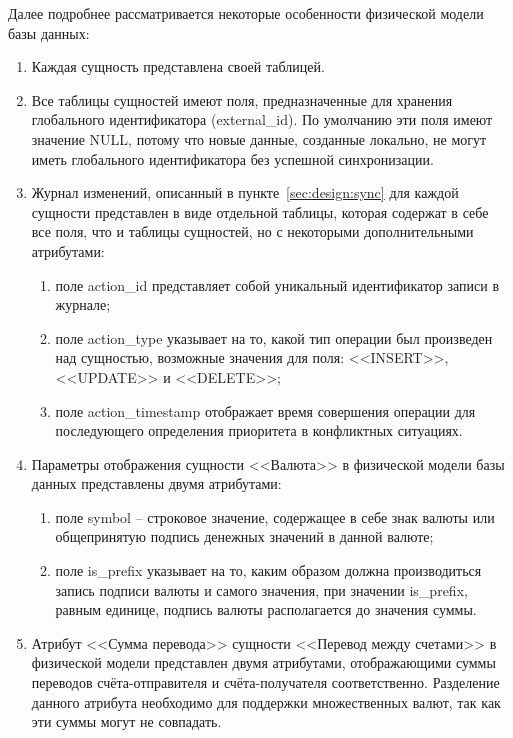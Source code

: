 Далее подробнее рассматривается некоторые особенности физической модели базы данных:
\begin{enumerate}
    \item Каждая сущность представлена своей таблицей.
    \item Все таблицы сущностей имеют поля, предназначенные для хранения глобального идентификатора (external\_id).
    По умолчанию эти поля имеют значение NULL, потому что новые данные, созданные локально, не могут иметь глобального идентификатора без успешной синхронизации.
    \item Журнал изменений, описанный в пункте~\ref{sec:design:sync} для каждой сущности представлен в виде отдельной таблицы, которая содержат в себе все поля, что и таблицы сущностей, но с некоторыми дополнительными атрибутами:
    \begin{enumerate}
        \item поле action\_id представляет собой уникальный идентификатор записи в журнале;
        \item поле action\_type указывает на то, какой тип операции был произведен над сущностью, возможные значения для поля: <<INSERT>>, <<UPDATE>> и <<DELETE>>;
        \item поле action\_timestamp отображает время совершения операции для последующего определения приоритета в конфликтных ситуациях.
    \end{enumerate}
    \item Параметры отображения сущности <<Валюта>> в физической модели базы данных представлены двумя атрибутами:
    \begin{enumerate}
        \item поле symbol -- строковое значение, содержащее в себе знак валюты или общепринятую подпись денежных значений в данной валюте;
        \item поле is\_prefix указывает на то, каким образом должна производиться запись подписи валюты и самого значения, при значении is\_prefix, равным единице, подпись валюты располагается до значения суммы.
    \end{enumerate}
    \item Атрибут <<Сумма перевода>> сущности <<Перевод между счетами>> в физической модели представлен двумя атрибутами, отображающими суммы переводов счёта-отправителя и счёта-получателя соответственно.
    Разделение данного атрибута необходимо для поддержки множественных валют, так как эти суммы могут не совпадать.
\end{enumerate}

